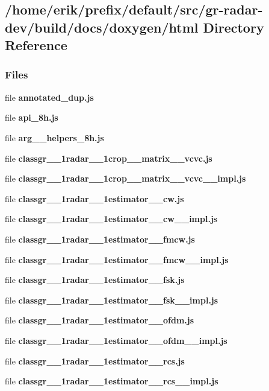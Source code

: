 \subsection{/home/erik/prefix/default/src/gr-\/radar-\/dev/build/docs/doxygen/html Directory Reference}
\label{dir_aeab64fe673c37b32fffe0f0e4933e15}
\subsubsection*{Files}
\begin{DoxyCompactItemize}
\item 
file {\bf annotated\+\_\+dup.\+js}
\item 
file {\bf api\+\_\+8h.\+js}
\item 
file {\bf arg\+\_\+\+\_\+helpers\+\_\+8h.\+js}
\item 
file {\bf classgr\+\_\+\_\+1radar\+\_\+\_\+1crop\+\_\+\+\_\+matrix\+\_\+\+\_\+vcvc.\+js}
\item 
file {\bf classgr\+\_\+\_\+1radar\+\_\+\_\+1crop\+\_\+\+\_\+matrix\+\_\+\+\_\+vcvc\+\_\+\+\_\+impl.\+js}
\item 
file {\bf classgr\+\_\+\_\+1radar\+\_\+\_\+1estimator\+\_\+\+\_\+cw.\+js}
\item 
file {\bf classgr\+\_\+\_\+1radar\+\_\+\_\+1estimator\+\_\+\+\_\+cw\+\_\+\+\_\+impl.\+js}
\item 
file {\bf classgr\+\_\+\_\+1radar\+\_\+\_\+1estimator\+\_\+\+\_\+fmcw.\+js}
\item 
file {\bf classgr\+\_\+\_\+1radar\+\_\+\_\+1estimator\+\_\+\+\_\+fmcw\+\_\+\+\_\+impl.\+js}
\item 
file {\bf classgr\+\_\+\_\+1radar\+\_\+\_\+1estimator\+\_\+\+\_\+fsk.\+js}
\item 
file {\bf classgr\+\_\+\_\+1radar\+\_\+\_\+1estimator\+\_\+\+\_\+fsk\+\_\+\+\_\+impl.\+js}
\item 
file {\bf classgr\+\_\+\_\+1radar\+\_\+\_\+1estimator\+\_\+\+\_\+ofdm.\+js}
\item 
file {\bf classgr\+\_\+\_\+1radar\+\_\+\_\+1estimator\+\_\+\+\_\+ofdm\+\_\+\+\_\+impl.\+js}
\item 
file {\bf classgr\+\_\+\_\+1radar\+\_\+\_\+1estimator\+\_\+\+\_\+rcs.\+js}
\item 
file {\bf classgr\+\_\+\_\+1radar\+\_\+\_\+1estimator\+\_\+\+\_\+rcs\+\_\+\+\_\+impl.\+js}

\end{DoxyCompactItemize}
